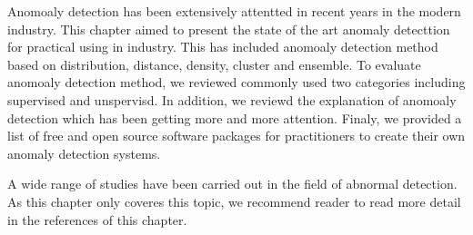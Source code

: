 Anomoaly detection has been extensively
attentted in recent years in the modern industry.
This chapter aimed to present the state of the art
anomaly detecttion for practical using in industry.
This has included anomoaly detection method based on distribution,
distance,
density,
cluster and ensemble.
To evaluate anomoaly detection method,
we reviewed commonly used
two categories including supervised and unspervisd.
In addition,
we reviewd the explanation of anomoaly detection which
has been getting more and more attention.
Finaly,
we provided a list of free and open source software packages for
practitioners to create their own anomaly detection systems.

A wide range of studies have been carried out in the field of abnormal detection.
As this chapter only coveres this topic,
we recommend reader to read more detail in the references of this chapter.






